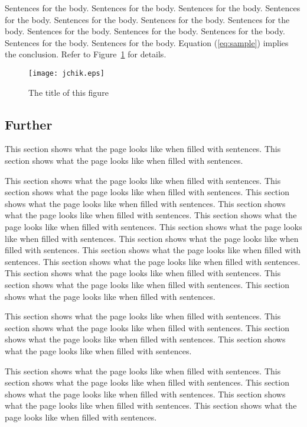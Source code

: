 Sentences for the body.  Sentences for the body.  Sentences for the body.
Sentences for the body.  Sentences for the body.  Sentences for the body.
Sentences for the body.  Sentences for the body.  Sentences for the body.
Sentences for the body.  Sentences for the body.  Sentences for the body.
Equation (\ref{eq:sample}) implies the conclusion.
Refer to Figure~\ref{figure:sample} for details.

\begin{figure}[tbp]
 \begin{center}
  \texttt{[image: jchik.eps]}
 \end{center}
 \caption{\label{figure:sample}The title of this figure}
\end{figure}

\subsection{Further}

This section shows what the page looks like when filled with sentences.
This section shows what the page looks like when filled with sentences.

This section shows what the page looks like when filled with sentences.
This section shows what the page looks like when filled with sentences.
This section shows what the page looks like when filled with sentences.
This section shows what the page looks like when filled with sentences.
This section shows what the page looks like when filled with sentences.
This section shows what the page looks like when filled with sentences.
This section shows what the page looks like when filled with sentences.
This section shows what the page looks like when filled with sentences.
This section shows what the page looks like when filled with sentences.
This section shows what the page looks like when filled with sentences.
This section shows what the page looks like when filled with sentences.
This section shows what the page looks like when filled with sentences.

This section shows what the page looks like when filled with sentences.
This section shows what the page looks like when filled with sentences.
This section shows what the page looks like when filled with sentences.
This section shows what the page looks like when filled with sentences.

This section shows what the page looks like when filled with sentences.
This section shows what the page looks like when filled with sentences.
This section shows what the page looks like when filled with sentences.
This section shows what the page looks like when filled with sentences.
This section shows what the page looks like when filled with sentences.

